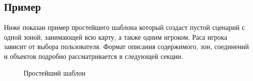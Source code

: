 \subsection{Пример}
Ниже показан пример простейшего шаблона который создаст пустой сценарий с одной зоной, занимающей всю карту, а также одним игроком. Раса игрока зависит от выбора пользователя.
Формат описания содержимого, зон, соединений и объектов подробно рассматривается в следующей секции.
\begin{figure}[H]

\caption{Простейший шаблон}
\end{figure}